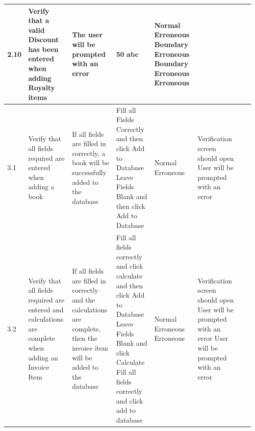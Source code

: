 \begin{landscape}
\begin{center}
\begin{longtable}{|p{1.5cm}|p{2cm}|p{2.5cm}|p{2.5cm}|p{2cm}|p{2cm}|p{2cm}|p{2cm}|}
\rowcolor{lightgray}  2.10 & Verify that a valid Discount has been entered when adding Royalty items & The user will be prompted with an error & 50 \newline 5.5 \newline 0 \newline -1 \newline 100 \newline 101 \newline abc & Normal \newline Erroneous \newline Boundary \newline Erroneous \newline Boundary \newline Erroneous \newline Erroneous & & \\ \hline
        3.1 & Verify that all fields required are entered when adding a book & If all fields are filled in correctly, a book will be successfully added to the database & Fill all Fields Correctly and then click Add to Database \newline Leave Fields Blank and then click Add to Database & Normal \newline Erroneous & Verification screen should open \newline User will be prompted with an error & & \\ \hline
        3.2 & Verify that all fields required are entered and calculations are complete when adding an Invoice Item & If all fields are filled in correctly and the calculations are complete, then the invoice item will be added to the database & Fill all fields correctly and click calculate and then click Add to Database \newline Leave Fields Blank and click Calculate \newline Fill all fields correctly and click add to database & Normal \newline Erroneous \newline Erroneous & Verification screen should open \newline User will be prompted with an error \newline User will be prompted with an error & & \\ \hline

\end{longtable}
\end{center}
\end{landscape}
